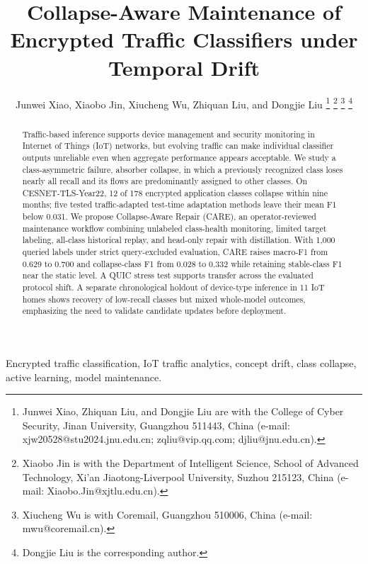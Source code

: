 \documentclass[journal]{IEEEtran}
\begin{document}
\title{Collapse-Aware Maintenance of Encrypted Traffic Classifiers under Temporal Drift}
\author{Junwei Xiao, Xiaobo Jin, Xiucheng Wu, Zhiquan Liu, and Dongjie Liu%
\thanks{Junwei Xiao, Zhiquan Liu, and Dongjie Liu are with the College of Cyber Security, Jinan University, Guangzhou 511443, China (e-mail: xjw20528@stu2024.jnu.edu.cn; zqliu@vip.qq.com; djliu@jnu.edu.cn).}%
\thanks{Xiaobo Jin is with the Department of Intelligent Science, School of Advanced Technology, Xi'an Jiaotong-Liverpool University, Suzhou 215123, China (e-mail: Xiaobo.Jin@xjtlu.edu.cn).}%
\thanks{Xiucheng Wu is with Coremail, Guangzhou 510006, China (e-mail: mwu@coremail.cn).}%
\thanks{Dongjie Liu is the corresponding author.}}
\maketitle

\begin{abstract}
Traffic-based inference supports device management and security monitoring in Internet of Things (IoT) networks, but evolving traffic can make individual classifier outputs unreliable even when aggregate performance appears acceptable. We study a class-asymmetric failure, absorber collapse, in which a previously recognized class loses nearly all recall and its flows are predominantly assigned to other classes. On CESNET-TLS-Year22, 12 of 178 encrypted application classes collapse within nine months; five tested traffic-adapted test-time adaptation methods leave their mean F1 below 0.031. We propose Collapse-Aware Repair (CARE), an operator-reviewed maintenance workflow combining unlabeled class-health monitoring, limited target labeling, all-class historical replay, and head-only repair with distillation. With 1,000 queried labels under strict query-excluded evaluation, CARE raises macro-F1 from 0.629 to 0.700 and collapse-class F1 from 0.028 to 0.332 while retaining stable-class F1 near the static level. A QUIC stress test supports transfer across the evaluated protocol shift. A separate chronological holdout of device-type inference in 11 IoT homes shows recovery of low-recall classes but mixed whole-model outcomes, emphasizing the need to validate candidate updates before deployment.
\end{abstract}
\begin{IEEEkeywords}
Encrypted traffic classification, IoT traffic analytics, concept drift, class collapse, active learning, model maintenance.
\end{IEEEkeywords}
\end{document}
